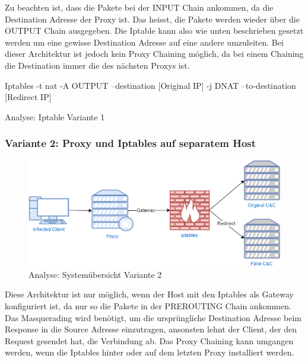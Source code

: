 Zu beachten ist, dass die Pakete bei der INPUT Chain ankommen, da die Destination Adresse der Proxy ist. Das heisst, die Pakete werden wieder über die OUTPUT Chain ausgegeben. Die Iptable kann also wie unten beschrieben gesetzt werden um eine gewisse Destination Adresse auf eine andere umzuleiten. Bei dieser Architektur ist jedoch kein Proxy Chaining möglich, da bei einem Chaining die Destination immer die des nächsten Proxys ist.

\begin{listing}[H]
\begin{fancycode}
Iptables -t nat -A OUTPUT --destination [Original IP] -j DNAT --to-destination [Redirect IP]
\end{fancycode}
\caption{Analyse: Iptable Variante 1}
\label{lst:Iptable: Variante 1, Proxy und Iptables auf dem selben Host}
\end{listing}


\subsubsection{Variante 2: Proxy und Iptables auf separatem Host}

\begin{figure}[H]
	\centering
	\includegraphics[width=\textwidth]{img/Redirect-detached.png}
	\caption{Analyse: Systemübersicht Variante 2}
	\label{fig:Systemübersicht: Variante 2, Proxy und Iptables auf separatem Host}
\end{figure}

Diese Architektur ist nur möglich, wenn der Host mit den Iptables als Gateway konfiguriert ist, da nur so die Pakete in der PREROUTING Chain ankommen. Das Masquerading wird benötigt, um die ursprüngliche Destination Adresse beim Response in die Source Adresse einzutragen, ansonsten lehnt der Client, der den Request gesendet hat, die Verbindung ab. Das Proxy Chaining kann umgangen werden, wenn die Iptables hinter oder auf dem letzten Proxy installiert werden.

